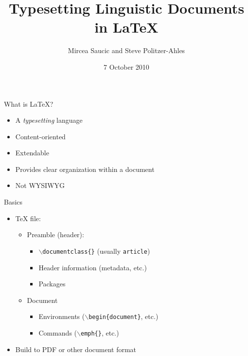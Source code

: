 \documentclass{beamer}
\title[\LaTeX{} Workshop]{Typesetting Linguistic Documents in \LaTeX}
\author[Saucic and Politzer-Ahles]{Mircea Saucic and Steve Politzer-Ahles}
\institute[KU]{
  Department of Linguistics\\
  University of Kansas
}
\date[October 2010]{7 October 2010}
\begin{document}
\begin{frame}[plain]
	\titlepage
\end{frame}

\begin{frame}{What is \LaTeX{}?}
	\begin{itemize}
	\pause
	\item A \emph{typesetting} language
	\pause
	\item Content-oriented
	\pause
	\item Extendable
	\pause
	\item Provides clear organization within a document
	\pause
	\item Not WYSIWYG
	\end{itemize}
\end{frame}

\begin{frame}{Basics}
	\begin{itemize}
	\item TeX file:
	\pause
		\begin{itemize}
		\item Preamble (header):
			\begin{itemize}
			\item \texttt{$\backslash$documentclass\{\}} (usually \texttt{article})
			\item Header information (metadata, etc.)
			\item Packages
			\pause
			\end{itemize}
		\item Document
			\begin{itemize}
			\item Environments (\texttt{$\backslash$begin\{document\}}, etc.)
			\item Commands (\texttt{$\backslash$emph\{\}}, etc.)
			\pause
			\end{itemize}
		\end{itemize}
	\item Build to PDF or other document format
	\end{itemize}
\end{frame}
\end{document}
